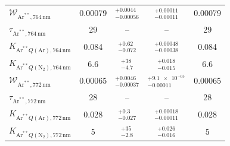 \begin{table}[htbp]
\begin{tabular}{lcccc}
$\mathcal{W}_{\mathrm{Ar}^{**},764\,\mathrm{nm}}$ & \num{0.00079} & $^{+\num{0.0044}}_{-\num{0.00056}}$ & $^{+\num{0.00011}}_{-\num{0.00011}}$ & \num{0.00079} \\
$\tau_{\mathrm{Ar}^{**},764\,\mathrm{nm}}$ & \num{29} & -- & -- & \num{29} \\
$K_{\mathrm{Ar}^{**}Q(\mathrm{Ar}),764\,\mathrm{nm}}$ & \num{0.084} & $^{+\num{0.62}}_{-\num{0.072}}$ & $^{+\num{0.00048}}_{-\num{0.00038}}$ & \num{0.084} \\
$K_{\mathrm{Ar}^{**}Q(\mathrm{N}_2),764\,\mathrm{nm}}$ & \num{6.6} & $^{+\num{38}}_{-\num{4.7}}$ & $^{+\num{0.018}}_{-\num{0.015}}$ & \num{6.6} \\
$\mathcal{W}_{\mathrm{Ar}^{**},772\,\mathrm{nm}}$ & \num{0.00065} & $^{+\num{0.0046}}_{-\num{0.00037}}$ & $^{+\num{9.1e-05}}_{-\num{0.00011}}$ & \num{0.00065} \\
$\tau_{\mathrm{Ar}^{**},772\,\mathrm{nm}}$ & \num{28} & -- & -- & \num{28} \\
$K_{\mathrm{Ar}^{**}Q(\mathrm{Ar}),772\,\mathrm{nm}}$ & \num{0.028} & $^{+\num{0.3}}_{-\num{0.027}}$ & $^{+\num{0.00018}}_{-\num{0.00011}}$ & \num{0.028} \\
$K_{\mathrm{Ar}^{**}Q(\mathrm{N}_2),772\,\mathrm{nm}}$ & \num{5} & $^{+\num{35}}_{-\num{2.8}}$ & $^{+\num{0.026}}_{-\num{0.016}}$ & \num{5} \\
\bottomrule
\end{tabular}
\end{table}
